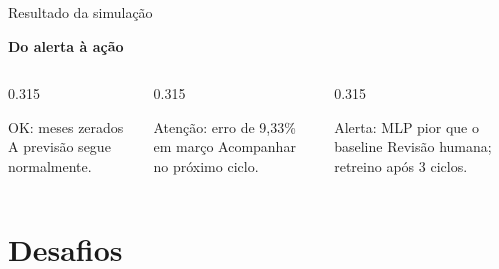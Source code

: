 \documentclass[aspectratio=169,10pt]{beamer}
\begin{document}
\begin{frame}[t]{Resultado da simulação}
\begin{tabular}
    \bottomrule
  \end{tabular}\par
  \vspace{0.12cm}
  {\color{uelgreen}\small\textbf{Do alerta à ação}}\par
  \vspace{0.05cm}
  \begin{columns}[T,onlytextwidth]
    \begin{column}[T]{0.315\textwidth}
      \begin{block}{OK: meses zerados}
        \scriptsize A previsão segue normalmente.
      \end{block}
    \end{column}
    \begin{column}[T]{0.315\textwidth}
      \begin{block}{Atenção: erro de 9,33\% em março}
        \scriptsize Acompanhar no próximo ciclo.
      \end{block}
    \end{column}
    \begin{column}[T]{0.315\textwidth}
      \begin{block}{Alerta: MLP pior que o baseline}
        \scriptsize Revisão humana; retreino após 3 ciclos.
      \end{block}
    \end{column}
  \end{columns}
\end{frame}

\section{Desafios}
\end{document}
